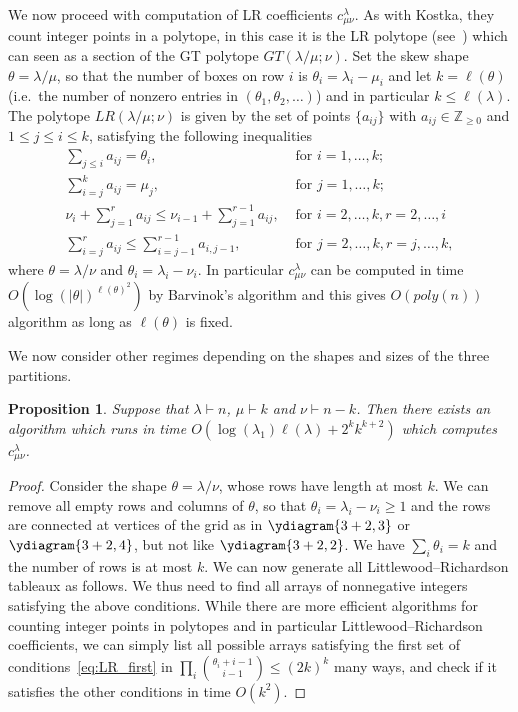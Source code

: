 \documentclass[11pt]{amsart}
\newtheorem{prop}[thm]{Proposition}
\theoremstyle{plain}
\theoremstyle{definition}
\numberwithin{equation}{section}
\newcommand{\la}{\lambda}
\newcommand{\poly}{poly}
\def\la{\lambda}
\begin{document}
We now proceed with computation of LR coefficients $c^\la_{\mu\nu}$. As with Kostka, they count integer points in a polytope, in this case it is the LR polytope (see~\cite{PV05}) which can seen as a section of the GT polytope $GT(\la/\mu;\nu)$. Set the skew shape $\theta=\la/\mu$, so that the number of boxes on row $i$ is $\theta_i=\la_i-\mu_i$ and let $k=\ell(\theta)$ (i.e.\ the number of nonzero entries in $(\theta_1,\theta_2,\ldots)$) and in particular $k \leq \ell(\la)$. The polytope $LR(\la/\mu;\nu)$  is given by the set of points $\{a_{ij}\}$ with $a_{ij}\in \mathbb{Z}_{\geq 0}$ and $1\leq j \leq i \leq k$, satisfying the following inequalities
\begin{align}
\sum_{j\leq i} a_{ij} = \theta_i, &\text{ for } i=1,\ldots,k; \label{eq:LR_first} \\
\sum_{i=j}^k a_{ij} = \mu_j,& \text{ for }j=1,\ldots,k; \\
\nu_i+\sum_{j=1}^r a_{ij} \leq \nu_{i-1}+\sum_{j=1}^{r-1} a_{ij}, &\text{ for }i=2,\ldots,k, r=2,\ldots,i\\
\sum_{i=j}^r a_{ij} \leq \sum_{i=j-1}^{r-1} a_{i,j-1}, &\text{ for }j=2,\ldots,k, r=j,\ldots,k,
\end{align}
where $\theta=\la/\nu$ and $\theta_i = \la_i-\nu_i$. 
In particular $c^\la_{\mu\nu}$ can be computed in time $O( \log(|\theta|)^{ \ell(\theta)^2} )$ by Barvinok's algorithm and this gives $O(\poly(n))$ algorithm as long as $\ell(\theta)$ is fixed. 

We now consider other regimes depending on the shapes and sizes of the three partitions.


\begin{prop}\label{prop:LR_compute}
Suppose that $\la \vdash n$, $\mu \vdash k$ and $\nu \vdash n-k$. Then there exists an algorithm which runs in time $O(\log(\la_1)\ell(\la) + 2^k k^{k+2})$ which computes $c^{\la}_{\mu\nu}$.
\end{prop}
\begin{proof}
Consider the shape $\theta=\la/\nu$, whose rows have length at most $k$. We can remove all empty rows and columns of $\theta$, so that $\theta_i =\la_i-\nu_i \geq 1$ and the rows are connected at vertices of the grid as in $\ydiagram{3+2,3}$ or $\ydiagram{3+2,4}$, but not like $\ydiagram{3+2,2}$. We have $\sum_i \theta_i=k$ and the number of rows is at most $k$. 
We can now generate all Littlewood--Richardson tableaux as follows. 
We thus need to find all arrays of nonnegative integers satisfying the above conditions. While there are more efficient algorithms for counting integer points in polytopes and in particular Littlewood--Richardson coefficients, we can simply list all possible arrays satisfying the first set of conditions~\eqref{eq:LR_first} in $\prod_i \binom{ \theta_i+i-1}{i-1}\leq (2k)^k$ many ways, and check if it satisfies the other conditions in time $O(k^2)$.  
\end{proof}
\end{document}

